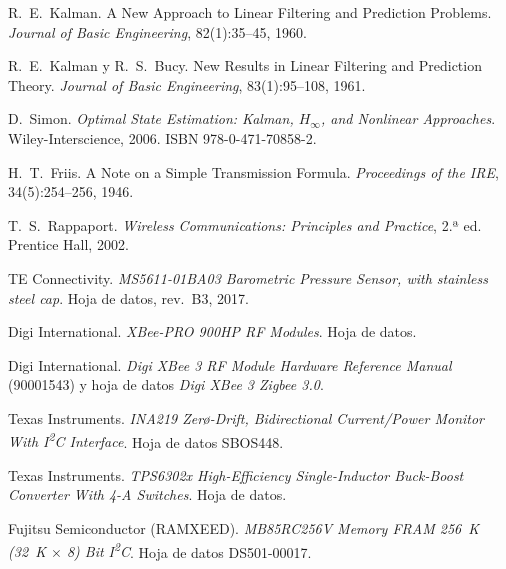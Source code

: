  R.~E.~Kalman. A New Approach to Linear Filtering and
  Prediction Problems. \emph{Journal of Basic Engineering}, 82(1):35--45, 1960.

 R.~E.~Kalman y R.~S.~Bucy. New Results in Linear
  Filtering and Prediction Theory. \emph{Journal of Basic Engineering}, 83(1):95--108, 1961.

 D.~Simon. \emph{Optimal State Estimation: Kalman,
  $H_\infty$, and Nonlinear Approaches}. Wiley-Interscience, 2006.
  ISBN 978-0-471-70858-2.

 H.~T.~Friis. A Note on a Simple Transmission Formula.
  \emph{Proceedings of the IRE}, 34(5):254--256, 1946.

 T.~S.~Rappaport. \emph{Wireless Communications:
  Principles and Practice}, 2.ª ed. Prentice Hall, 2002.

 TE Connectivity. \emph{MS5611-01BA03 Barometric Pressure
  Sensor, with stainless steel cap}. Hoja de datos, rev.~B3, 2017.

 Digi International. \emph{XBee-PRO 900HP RF Modules}.
  Hoja de datos.

 Digi International. \emph{Digi XBee 3 RF Module Hardware
  Reference Manual} (90001543) y hoja de datos \emph{Digi XBee 3 Zigbee 3.0}.

 Texas Instruments. \emph{INA219 Zerø-Drift, Bidirectional
  Current/Power Monitor With I\textsuperscript{2}C Interface}. Hoja de datos SBOS448.

 Texas Instruments. \emph{TPS6302x High-Efficiency
  Single-Inductor Buck-Boost Converter With 4-A Switches}. Hoja de datos.

 Fujitsu Semiconductor (RAMXEED). \emph{MB85RC256V
  Memory FRAM 256~K (32~K $\times$ 8) Bit I\textsuperscript{2}C}. Hoja de datos
  DS501-00017.
